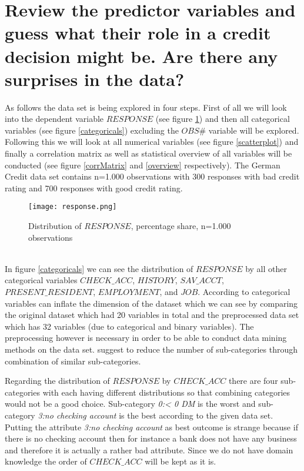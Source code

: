 \newpage
\section{Review the predictor variables and guess what their role in a credit decision might be. Are there any surprises in the data?} \label{appendix1}
As follows the data set is being explored in four steps. First of all we will look into the dependent variable $RESPONSE$ (see figure \ref{response}) and then all categorical variables (see figure \ref{categoricals}) excluding the $ OBS\#$ variable will be explored. Following this we will look at all numerical variables (see figure \ref{scatterplot}) and finally a correlation matrix as well as statistical overview of all variables will be conducted (see figure \ref{corrMatrix} and \ref{overview} respectively). The German Credit data set contains n=1.000 observations with 300 responses with bad credit rating and 700 responses with good credit rating.\\ %
\begin{figure}[htbp]
	\centering
	\texttt{[image: response.png]}
	\caption{Distribution of $RESPONSE$, percentage share, n=1.000 observations}
	\label{response}
\end{figure}\\
In figure \ref{categoricals} we can see the distribution of $RESPONSE$ by all other categorical variables $CHECK\_ACC$, $HISTORY$, $SAV\_ACCT$, $PRESENT\_RESIDENT$, $EMPLOYMENT$, and $JOB$. According to \cite[pp.76-77]{shmueli} categorical variables can inflate the dimension of the dataset which we can see by comparing the original dataset which had 20 variables in total and the preprocessed data set which has 32 variables (due to categorical and binary variables). The preprocessing however is necessary in order to be able to conduct data mining methods on the data set. \cite[pp.76-77]{shmueli} suggest to reduce the number of sub-categories through combination of similar sub-categories. 

Regarding the distribution of $RESPONSE$ by $CHECK\_ACC$ there are four sub-categories with each having different distributions so that combining categories would not be a good choice. Sub-category \textit{0:< 0 DM} is the worst and sub-category \textit{3:no checking account} is the best according to the given data set. Putting the attribute \textit{3:no checking account} as best outcome is strange because if there is no checking account then for instance a bank does not have any business and therefore it is actually a rather bad attribute. Since we do not have domain knowledge the order of $CHECK\_ACC$ will be kept as it is.

